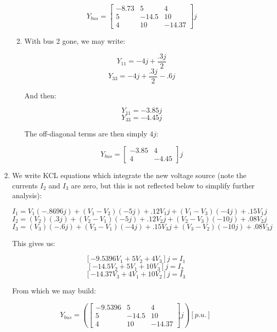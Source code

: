 \begin{enumerate}
\begin{enumerate}
        $$\boxed{Y_{bus}=\left[ \begin{matrix}-8.73 & 5 & 4\\ 5 & -14.5 & 10\\ 4 & 10 & -14.37 \end{matrix} \right]j}$$

      \item With bus 2 gone, we may write:

        $$Y_{11}=-4j+\frac{.3j}{2}$$
        $$Y_{33}=-4j+\frac{.3j}{2}-.6j$$

        And then:

        $$Y_{11}=-3.85j$$
        $$Y_{33}=-4.45j$$

        The off-diagonal terms are then simply $4j$:

        $$\boxed{Y_{bus}=\left[ \begin{matrix} -3.85 & 4\\ 4 & -4.45 \end{matrix}\right]j}$$

    \end{enumerate}

  \item 

    We write KCL equations which integrate the new voltage source (note the currents $I_2$ and $I_3$ are zero, but this is not reflected below to simplify further analysis):

    $$I_1=V_1(-.8696j) + (V_1-V_2)(-5j)+.12V_1j+(V_1-V_3)(-4j)+.15V_1j$$
    $$I_2=(V_2)(.3j)+(V_2-V_1)(-5j)+.12V_2j+(V_2-V_3)(-10j)+.08V_2j$$
    $$I_3=(V_3)(-.6j)+(V_3-V_1)(-4j)+.15V_3j+(V_3-V_2)(-10j)+.08V_3j$$

    This gives us:

    $$[-9.5396V_1+5V_2+4V_3]j=I_1$$
    $$[-14.5V_2+5V_1+10V_3]j=I_2$$
    $$[-14.37V_3+4V_1+10V_2]j=I_3$$

    From which we may build:

    $$\boxed{Y_{bus}=\left( \left[ \begin{matrix} -9.5396 & 5 & 4\\ 5 & -14.5 & 10\\ 4 & 10 & -14.37\end{matrix}\right]j \right)[p.u.]}$$

\end{enumerate}



